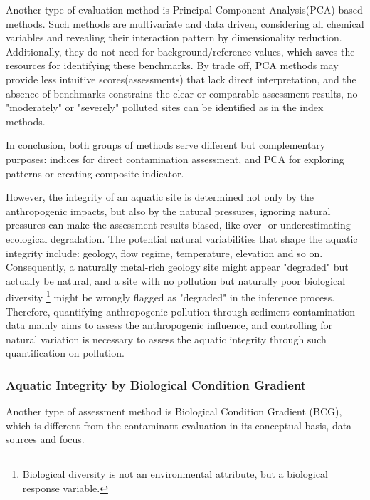 
Another type of evaluation method is Principal Component Analysis(PCA) based methods.
Such methods are multivariate and data driven, considering all chemical variables and revealing their 
interaction pattern by dimensionality reduction. 
Additionally, they do not need for background/reference values, which saves the resources for identifying 
these benchmarks. By trade off, PCA methods may provide less intuitive scores(assessments) that lack
direct interpretation, and the absence of benchmarks constrains the clear or comparable assessment results,
no "moderately" or "severely" polluted sites can be identified as in the index methods.

In conclusion, both groups of methods serve different but complementary purposes:
indices for direct contamination assessment, and PCA for exploring patterns or creating composite 
indicator.


However, the integrity of an aquatic site is determined not only by the anthropogenic impacts, but also by the natural pressures,
ignoring natural pressures can make the assessment results biased, like over- or underestimating ecological degradation.
The potential natural variabilities that shape the aquatic integrity include:
geology, flow regime, temperature, elevation and so on.
Consequently, a naturally metal-rich geology site might appear "degraded" but actually be natural,
and a site with no pollution but naturally poor biological diversity
\footnote{Biological diversity is not an environmental attribute, but a biological response variable.}
might be wrongly flagged as "degraded" in
the inference process.
Therefore, quantifying anthropogenic pollution through sediment contamination data mainly 
aims to assess the anthropogenic influence, and controlling for natural variation
is necessary to assess the aquatic integrity through such quantification on pollution.


\subsubsection{Aquatic Integrity by Biological Condition Gradient}

Another type of assessment method is Biological Condition Gradient (BCG),
which is different from the contaminant evaluation in its conceptual basis, data sources and focus.

